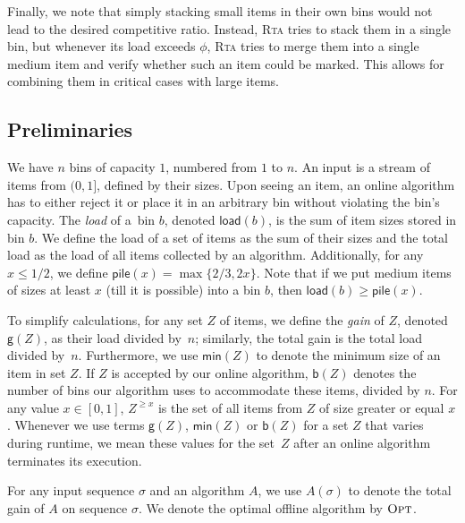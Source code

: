 \documentclass[a4paper,USenglish,cleveref]{lipics-v2019}
\newcommand{\smallBoundary}{\ensuremath{\phi}}
\newcommand{\B}{\textsf{b}}
\newcommand{\gain}{\textsf{g}}
\newcommand{\load}{\textsf{load}}
\newcommand{\stack}{\textsf{pile}}
\newcommand{\mn}{\textsf{min}}
\newcommand{\ALG}{\textsc{Rta}\xspace}
\newcommand{\OPT}{\textsc{Opt}\xspace}
\begin{document}
Finally, we note that simply stacking small items in their own bins would not
lead to the desired competitive ratio. Instead, \ALG tries to stack them in a
single bin, but whenever its load exceeds $\smallBoundary$, \ALG
tries to merge them into a single medium item and verify whether such an item
could be marked. This allows for combining them in critical cases with large
items. 
    
    


\subsection{Preliminaries}

We have $n$ bins of capacity $1$, numbered from $1$ to $n$. An input is a stream
of items from $(0, 1]$, defined by their sizes. Upon seeing an item, an online
algorithm has to either reject it or place it in an arbitrary bin without
violating the bin's capacity. The \emph{load} of a~bin $b$, denoted $\load(b)$,
is the sum of item sizes stored in bin $b$. We define the load of a set of items
as the sum of their sizes and the total load as the load of all items collected
by an algorithm. Additionally, for any $x \leq 1/2$, we define 
$\stack(x) = \max\{2/3, 2 x\}$. Note that if we put medium items of sizes 
at least $x$ (till it is possible) into a bin $b$, then $\load(b) \geq \stack(x)$.

To simplify calculations, for any set $Z$ of items, we define the \emph{gain} of
$Z$, denoted $\gain(Z)$, as their load divided by~$n$; similarly, the total gain
is the total load divided by~$n$. Furthermore, we use $\mn(Z)$ to denote the
minimum size of an item in set $Z$. If $Z$ is accepted by our online algorithm,
$\B(Z)$ denotes the number of bins our algorithm uses to accommodate these items,
divided by $n$. For any value $x \in [0,1]$, $Z^{\geq x}$ is the set of
all items from $Z$ of size greater or equal $x$. Whenever we use terms 
$\gain(Z)$, $\mn(Z)$ or $\B(Z)$ for a set $Z$ that varies during runtime, we mean these values
for the set~$Z$ after an online algorithm terminates its execution.

For any input sequence $\sigma$ and an algorithm $A$, we use $A(\sigma)$ to denote
the total gain of $A$ on sequence $\sigma$. We denote the optimal offline
algorithm by $\OPT$.


\end{document}
